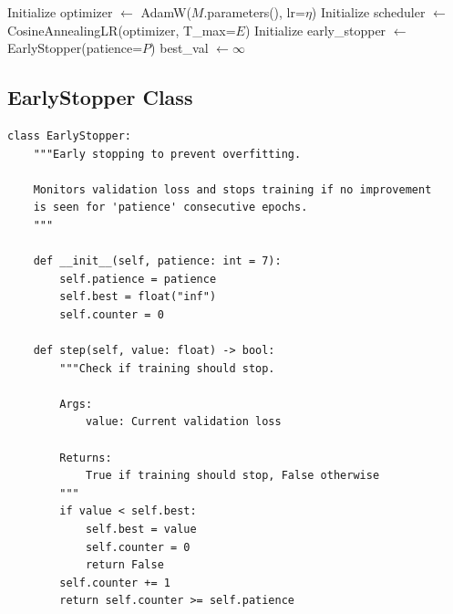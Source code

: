\documentclass[11pt,a4paper]{article}
\begin{document}
\begin{algorithm}[H]
    \caption{VAE Training Procedure}
    \label{alg:vae-training}
    \SetAlgoLined

    Initialize optimizer $\leftarrow$ AdamW($M$.parameters(), lr=$\eta$)\;
    Initialize scheduler $\leftarrow$ CosineAnnealingLR(optimizer, T\_max=$E$)\;
    Initialize early\_stopper $\leftarrow$ EarlyStopper(patience=$P$)\;
    best\_val $\leftarrow \infty$\;


\end{algorithm}

\subsection{EarlyStopper Class}

\begin{lstlisting}[caption={src/train\_vae.py - EarlyStopper}, label={lst:early-stopper}]
class EarlyStopper:
    """Early stopping to prevent overfitting.

    Monitors validation loss and stops training if no improvement
    is seen for 'patience' consecutive epochs.
    """

    def __init__(self, patience: int = 7):
        self.patience = patience
        self.best = float("inf")
        self.counter = 0

    def step(self, value: float) -> bool:
        """Check if training should stop.

        Args:
            value: Current validation loss

        Returns:
            True if training should stop, False otherwise
        """
        if value < self.best:
            self.best = value
            self.counter = 0
            return False
        self.counter += 1
        return self.counter >= self.patience
\end{lstlisting}
\end{document}

